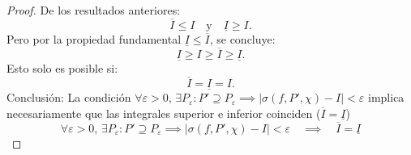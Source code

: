 \documentclass{article}
\begin{document}
\begin{proof}
		De los resultados anteriores:  
		\[
		\overline{I} \leq I \quad \text{y} \quad \underline{I} \geq I.
		\]  
		Pero por la propiedad fundamental \( \underline{I} \leq \overline{I} \), se concluye:  
		\[
		\underline{I} \geq I \geq \overline{I} \geq \underline{I}.
		\]  
		Esto solo es posible si:  
		\[
		\overline{I} = \underline{I} = I.
		\]
		Conclusión:
		La condición \( \forall \varepsilon > 0,\, \exists P_\varepsilon : P' \supseteq P_\varepsilon \implies |\sigma(f, P', \chi) - I| < \varepsilon \) implica necesariamente que las integrales superior e inferior coinciden (\( \overline{I} = \underline{I} \))
		\[
		\boxed{
			\forall \varepsilon > 0,\, \exists P_\varepsilon : P' \supseteq P_\varepsilon \implies |\sigma(f, P', \chi) - I| < \varepsilon \quad \implies \quad \overline{I} = \underline{I}
		}
		\]
	\end{proof}
	
\end{document}
